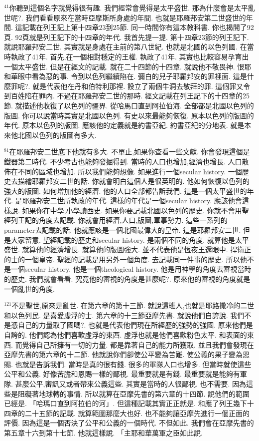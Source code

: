 \documentclass{book}
\begin{document}
$^{41}$你聽到這個名字就覺得很有趣.
我們經常會覺得是太平盛世.
那為什麼會是太平亂世呢?.
我們看看原來在當時亞摩斯所身處的年間.
也就是耶羅邦安第二世盛世的年間.
這記載在列王記上第十四章23到25節.
同一時間你有這本教科書.
你也揭開了92頁.
92頁就是列王記下的十四章的年代.
我首先提一提.
第十四章23節的列王記下.
就說耶羅邦安二世.
其實就是身處在主前的第八世紀.
也就是北國的以色列國.
在當時執政了41年.
首先,在一個相對穩定的王權.
執政了41年.
其實也比較容易孕育出一個太平盛世.
但是在經文的記載.
就在二十四節的十四章.
就說他不敬畏神.
恨耶和華眼中看為惡的事.
令到以色列繼續陷在.
彌白的兒子耶羅邦安的罪裡面.
這是什麼罪呢?.
就是代表他在丹和伯特利那裡.
設立了兩個牛洞去敬拜的罪.
這個罪又令到百姓陷在罪內.
不過在耶羅邦安二世的那時.
經文記載在列王記下的十四章的25節.
就描述他收復了以色列的疆界.
從哈馬口直到阿拉伯海.
全部都是北國以色列的版圖.
你可以說當時其實是北國以色列.
有史以來最能夠恢復.
原本以色列的版圖的年代.
原本以色列的版圖.
應該他的定義就是約書亞紀.
約書亞紀的分地表.
就是本來他北國以色列的版圖有多大.

$^{81}$在耶羅邦安二世底下他就有多大.
不單止,如果你查看一些文獻.
你會發現這個是鐵器第二時代.
不少考古也能夠發掘得到.
當時的人口也增加,經濟也增長.
人口散佈在不同的區域也增加.
所以我們能夠想像.
如果進行一個secular history.
一個歷史去描繪耶羅邦安二世的話.
你就會明白這個人是很英明的.
他如何恢復以色列的強大的版圖.
如何增加他的經濟.
他的人口全部都告訴我們.
這是一個太平盛世的年代.
是耶羅邦安二世所執政的年代.
這樣的年代是一個secular history.
應該他會這樣說.
如果你在中學,小學讀西史.
如果你要記載北國以色列的歷史.
你就不會用聖經列王記的角度去記載.
你就會用經濟,人口,版圖,軍事勢力.
這些一系列的parameter去記載的話.
他就應該是一個北國最偉大的皇帝.
這是耶羅邦安二世.
但是大家留意.
聖經記載的歷史和secular history.
是兩個不同的角度.
就算他是太平盛世.
就算他的經濟增長.
就算他的版圖強大.
並不代表他是恆夜王還眼中.
捍衛正的士的一個皇帝.
聖經的記載是用另外一個角度.
去記載同一件事的歷史.
所以他不是一個secular history.
他是一個theological history.
他是用神學的角度去審視當時的歷史.
我們就會看看.
究竟他的審視的角度是甚麼呢?.
原來他的審視的角度就是一個亂世的角度.

$^{121}$不是聖世,原來是亂世.
在第六章的第十三節.
就說這班人,也就是耶路撒冷的二世和以色列民.
是喜愛虛浮的士.
第六章的十三節亞摩先書.
就說他們自誇說.
我們不是憑自己的力量取了國嗎?.
也就是代表他們現在所經歷的強勢的強國.
原來他們是自誇的.
他們認為他們喜歡虛浮的東西.
虛浮也就是他們喜歡粉色太平.
和表面的東西.
而覺得自己所擁有一切的力量.
都是靠著自己的能力所獲取.
並且我們會發現在亞摩先書的第六章的十二節.
他就說你們卻使公平變為苦難.
使公義的果子變為恩賜.
也就是告訴我們.
當時是真的很有錢.
很多的軍隊人口也增多.
但當時就使這些公平和公義.
好像苦膽和恩賜一樣的鄙視.
最重要就是有錢.
最重要就是能夠有軍隊.
甚麼公平,審訊又或者帶來公義這些.
其實是當時的人很鄙視.
也不需要.
因為這些是阻礙著地球轉的事情.
所以就算在亞摩先書的第六章的十四節.
說他們的範圍已經是.
「哈瑪口直到阿拉伯的河」.
但這種記載其實正正就是.
和應了列王幾下十四章的二十五節的記載.
就算範圍那麼大也好.
也不能夠讓亞摩先進行一個正面的評價.
因為這是一個否決了公平和公義的一個時代.
不但如此.
我們會在亞摩先書的第五章十六到第十七節.
他就這樣說.
「主耶和華萬軍之臣如此說.
\end{document}

